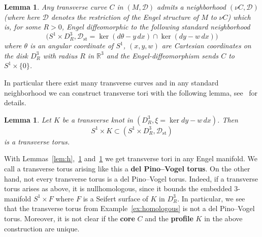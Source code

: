\documentclass{amsart} %
\newcommand{\R}{\mathbb{R}}
\newcommand{\Dst}{\mathcal{D}_{\mathrm{st}}}
\newcommand{\D}{\mathcal{D}}
\theoremstyle{thm}
\newtheorem{lem}[Theorem]{Lemma}
\theoremstyle{definition}
\begin{document}
\begin{lem}\label{lem:standard}
Any transverse curve $C$ in $(M,\D)$ admits a neighborhood $(\nu C,\D)$ (where here $\D$ denotes the restriction of the Engel structure of $M$ to $\nu C$) which is, for some $R>0$, Engel diffeomorphic to the following standard neighborhood
$$\big(S^1\times D_R^3,\Dst=\ker(d\theta-y\,dx)\cap\ker(dy-w\,dx)\big)$$
where $\theta$ is an angular coordinate of $S^1$, $(x,y,w)$ are Cartesian coordinates on the disk $D_R^3$ with radius $R$ in $\R^3$ and the Engel-diffeomorphism sends $C$ to $S^1\times\{0\}$.
\end{lem}

In particular there exist many transverse curves and in any standard neighborhood we can construct transverse tori with the following lemma, see~\cite[Lemma~3.3]{PV20} for details.

\begin{lem}\label{lem:delPinoVogel}
Let $K$ be a transverse knot in $(D_R^3,\xi=\ker dy-w\,dx)$. Then 
$$S^1\times K\subset(S^1\times D_R^3,\Dst)$$
is a transverse torus.
\end{lem}

With Lemmas~\ref{lem:h},~\ref{lem:standard} and~\ref{lem:delPinoVogel} we get transverse tori in any Engel manifold. We call a transverse torus arising like this a \textbf{del Pino--Vogel torus}. On the other hand, not every transverse torus is a del Pino--Vogel torus.  Indeed, if a transverse torus arises as above, it is nullhomologous, since it bounds the embedded $3$-manifold $S^1\times F$ where $F$ is a Seifert surface of $K$ in $D_R^3$. In particular, we see that the transverse torus from Example~\ref{ex:homologous} is not a del Pino--Vogel torus.
Moreover, it is not clear if the \textbf{core} $C$ and the \textbf{profile} $K$ in the above construction are unique.

\end{document}
